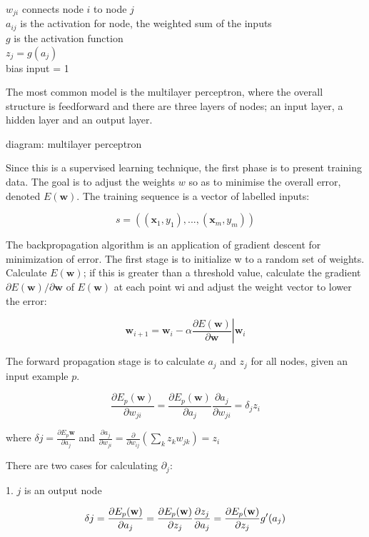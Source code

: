 \documentclass[12pt,a4,notitlepage]{report}
\renewcommand{\_}{\texttt{\symbol{95}}}
\newcommand{\<}{\texttt{\symbol{60}}}
\renewcommand{\>}{\texttt{\symbol{62}}}
\begin{document}
$w_{ji}$ connects node $i$ to node $j$ \\
$a_{ij}$ is the activation for node, the weighted sum of the inputs \\
$g$ is the activation function \\
$z_j = g(a_j)$ \\
bias input = 1

The most common model is the multilayer perceptron, where the overall structure is feedforward and there are three layers of nodes; an input layer, a hidden layer and an output layer. 

{diagram: multilayer perceptron}

Since this is a supervised learning technique, the first phase is to present training data. The goal is to adjust the weights $w$ so as to minimise the overall error, denoted ${E}(\mathbf w)$. The training sequence is a vector of labelled inputs:

\[ s = ((\mathbf x_1,y_1), ... , (\mathbf x_m, y_m)) \]

The backpropagation algorithm is an application of gradient descent for minimization of error. The first stage is to initialize w to a random set of weights. Calculate $E (\mathbf w)$; if this is greater than a threshold value, calculate the gradient $\partial E (\mathbf w) / \partial \mathbf w $ of $E(\mathbf w )$ at each point wi and adjust the weight vector to lower the error:

\[
\mathbf w_{i+1} = \mathbf w_i - \alpha \left. \frac {\partial E(\mathbf w)} {\partial \mathbf w} \right| \mathbf w_i
\]

The forward propagation stage is to calculate $a_j$ and $z_j$ for all nodes, given an input example $p$.

\[
\frac {\partial E_p(\mathbf w)} {\partial w_{ji}} = \frac {\partial E_p(\mathbf w)} {\partial a_j} \frac {\partial a_j} {\partial w_{ji}} = \delta_j z_i
\]

where $\delta j = \frac {\partial E_p\mathbf w} {\partial a_j}$
and $ \frac {\partial a_j} {\partial w_{ji}} = \frac {\partial} {\partial w_{ij}} \left( \sum_k {z_kw_{jk}} \right) = z_i$

There are two cases for calculating $\partial_j$:

1. $j$ is an output node

\[
\delta j = \frac {\partial E_p (\mathbf w)} {\partial a_j} \\
 = \frac {\partial E_p (\mathbf w)} {\partial z_j} \frac {\partial z_j} {\partial a_j} \\
 = \frac {\partial E_p (\mathbf w)} {\partial z_j}  g'(a_j)
\]
\end{document}
